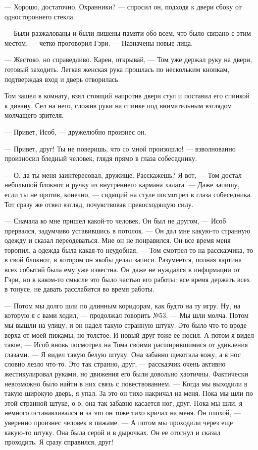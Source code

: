 — Хорошо, достаточно. Охранники? — спросил он, подходя к двери сбоку от одностороннего стекла.

— Были разжалованы и были лишены памяти обо всем, что было связано с этим местом, — четко проговорил Гэри. — Назначены новые лица.

— Жестоко, но справедливо. Карен, открывай, — Том уже держал руку на двери, готовый заходить. Легкая женская рука прошлась по нескольким кнопкам, подтверждая вход и дверь отворилась.

Том зашел в комнату, взял стоящий напротив двери стул и поставил его спинкой к дивану. Сел на него, сложив руки на спинке под внимательным взглядом молчащего зрителя.

— Привет, Исоб, — дружелюбно произнес он.

 — Привет, друг! Ты не поверишь, что со мной произошло! — взволнованно произносил бледный человек, глядя прямо в глаза собеседнику.

— О, да ты меня заинтересовал, дружище. Расскажешь? Я вот, — Том достал небольшой блокнот и ручку из внутреннего кармана халата. — Даже запишу, если ты не против, конечно, — сидящий на стуле посмотрел в глаза собеседника. Тот сразу же отвел взгляд, почувствовав превосходящую силу.

— Сначала ко мне пришел какой-то человек. Он был не другом, — Исоб прервался, задумчиво уставившись в потолок. — Он дал мне какую-то странную одежду и сказал переодеваться. Мне он не понравился. Он все время меня торопил, а одежда была какая-то неудобная, — Том смотрел то на рассказчика, то в свой блокнот, в котором он якобы делал записи. Разумеется, полная картина всех событий была ему уже известна. Он даже не нуждался в информации от Гэри, но в каком-то смысле это было частью его работы: все время держать всех в тонусе, не давать расслабится во время работы.

— Потом мы долго шли по длинным коридорам, как будто на ту игру. Ну, на которую я с вами ходил, — продолжал говорить №53. — Мы шли молча. Потом мы вышли на улицу, и он надел такую странную штуку. Это было что-то вроде верха от моей пижамы, но толстое. И новый друг тоже ее носил. А потом я видел такое, — Исоб вновь посмотрел на Тома своими расширившимися от удивления глазами. — Я видел такую белую штуку. Она забавно щекотала кожу, а в нос словно лезло что-то. Это так странно, друг, — рассказчик очень активно жестикулировал руками, но движения его были довольно хаотичны. Фактически невозможно было найти в них связь с повествованием. — Когда мы выходили в такую широкую дверь, я упал. За это он тихо накричал на меня. Пока мы шли по этой странной штуке, о-о, она так забавно касается ног, друг. Пока мы шли, я немного останавливался и за это он тоже тихо кричал на меня. Он плохой, — уверенно произнес человек в пижаме. — А потом мы проходили через еще какую-то штуку. Она была серой и в дырочках. Он ее отогнул и сказал проходить. Я сразу справился, друг!

